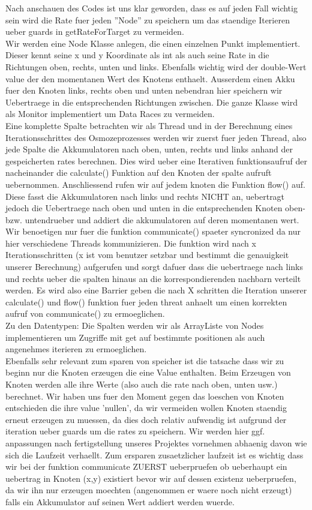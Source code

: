 \documentclass[12pt]{article}
\begin{document}
Nach anschauen des Codes ist uns klar geworden, dass es auf jeden Fall wichtig sein wird die Rate fuer jeden ''Node'' zu speichern um das staendige Iterieren ueber guards in getRateForTarget zu vermeiden.\\
Wir werden eine Node Klasse anlegen, die einen einzelnen Punkt implementiert. Dieser kennt seine x und y Koordinate als int als auch seine Rate in die Richtungen oben, rechts, unten und links. Ebenfalls wichtig wird der double-Wert value der den momentanen Wert des Knotens enthaelt. Ausserdem einen Akku fuer den Knoten links, rechts oben und unten nebendran hier speichern wir Uebertraege in die entsprechenden Richtungen zwischen. Die ganze Klasse wird als Monitor implementiert um Data Races zu vermeiden. \\
Eine komplette Spalte betrachten wir als Thread und in der Berechnung eines Iterationsschrittes des Osmozeprozesses werden wir zuerst fuer jeden Thread, also jede Spalte die Akkumulatoren nach oben, unten, rechts und links anhand der gespeicherten rates berechnen. Dies wird ueber eine Iterativen funktionsaufruf der nacheinander die calculate() Funktion auf den Knoten der spalte aufruft uebernommen. Anschliessend rufen wir auf jedem knoten die Funktion flow() auf. Diese fasst die Akkumulatoren nach links und rechts NICHT an, uebertragt jedoch die Uebertraege nach oben und unten in die entsprechenden Knoten oben- bzw. untendrueber und addiert die akkumulatoren auf deren momentanen wert. Wir benoetigen nur fuer die funktion communicate() spaeter syncronized da nur hier verschiedene Threads kommunizieren. Die funktion wird nach x Iterationsschritten (x ist vom benutzer setzbar und bestimmt die genauigkeit unserer Berechnung) aufgerufen und sorgt dafuer dass die uebertraege nach links und rechts ueber die spalten hinaus an die korrespondierenden nachbarn verteilt werden. Es wird also eine Barrier geben die nach X schritten die Iteration unserer calculate() und flow() funktion fuer jeden threat anhaelt um einen korrekten aufruf von communicate() zu ermoeglichen.\\
Zu den Datentypen: Die Spalten werden wir als ArrayListe von Nodes implementieren um Zugriffe mit get auf bestimmte positionen als auch angenehmes iterieren zu ermoeglichen.\\
Ebenfalls sehr relevant zum sparen von speicher ist die tatsache dass wir zu beginn nur die Knoten erzeugen die eine Value enthalten. Beim Erzeugen von Knoten werden alle ihre Werte (also auch die rate nach oben, unten usw.) berechnet. Wir haben uns fuer den Moment gegen das loeschen von Knoten entschieden die ihre value 'nullen', da wir vermeiden wollen Knoten staendig erneut erzeugen zu muessen, da dies doch relativ aufwendig ist aufgrund der iteration ueber guards um die rates zu speichern. Wir werden hier ggf. anpassungen nach fertigstellung unseres Projektes vornehmen abhaenig davon wie sich die Laufzeit verhaellt. Zum ersparen zusaetzlicher laufzeit ist es wichtig dass wir bei der funktion communicate ZUERST ueberpruefen ob ueberhaupt ein uebertrag in Knoten (x,y) existiert bevor wir auf dessen existenz ueberpruefen, da wir ihn nur erzeugen moechten (angenommen er waere noch nicht erzeugt) falls ein Akkumulator auf seinen Wert addiert werden wuerde.\\
\end{document}
